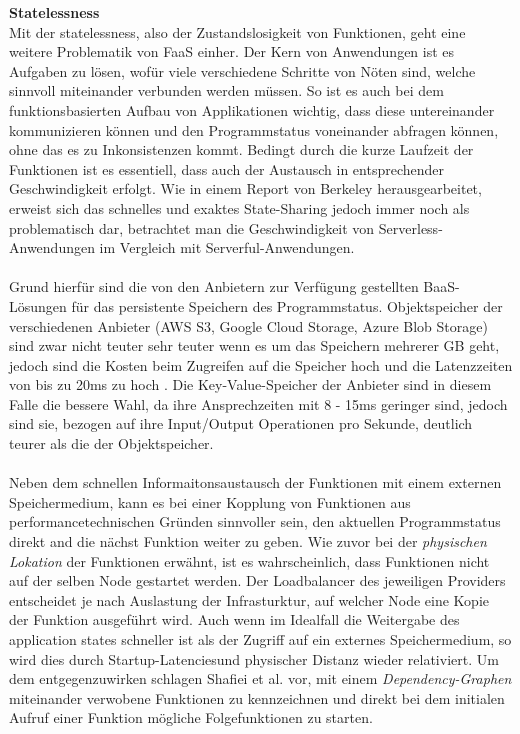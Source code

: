 \documentclass[11pt]{article}
\begin{document}
\glqq \textbf{Statelessness}\grqq{}\\
Mit der \glqq statelessness\grqq{}, also der Zustandslosigkeit von Funktionen, geht eine weitere Problematik von FaaS einher. Der Kern von Anwendungen ist es Aufgaben zu lösen, wofür viele verschiedene Schritte von Nöten sind, welche sinnvoll miteinander verbunden werden müssen. So ist es auch bei dem funktionsbasierten Aufbau von Applikationen wichtig, dass diese untereinander kommunizieren können und den Programmstatus voneinander abfragen können, ohne das es zu Inkonsistenzen kommt. Bedingt durch die kurze Laufzeit der Funktionen ist es essentiell, dass auch der Austausch in entsprechender Geschwindigkeit erfolgt. Wie in einem Report von Berkeley \cite{jonas2019cloud} herausgearbeitet, erweist sich das schnelles und exaktes \glqq State-Sharing\grqq{} jedoch immer noch als problematisch dar, betrachtet man die Geschwindigkeit von \glqq Serverless\grqq{}-Anwendungen im Vergleich mit \glqq Serverful\grqq{}-Anwendungen.\\\\ 
Grund hierfür sind die von den Anbietern zur Verfügung gestellten BaaS-Lösungen für das persistente Speichern des Programmstatus. Objektspeicher der verschiedenen Anbieter (AWS S3, Google Cloud Storage, Azure Blob Storage) sind zwar nicht teuter sehr teuter wenn es um das Speichern mehrerer GB geht, jedoch sind die Kosten beim Zugreifen auf die Speicher hoch und die Latenzzeiten von bis zu 20ms zu hoch \cite{jonas2019cloud}. Die Key-Value-Speicher der Anbieter sind in diesem Falle die bessere Wahl, da ihre Ansprechzeiten mit 8 - 15ms geringer sind, jedoch sind sie, bezogen auf ihre Input/Output Operationen pro Sekunde, deutlich teurer als die der Objektspeicher.\\\\ 
Neben dem schnellen Informaitonsaustausch der Funktionen mit einem externen Speichermedium, kann es bei einer Kopplung von Funktionen aus performancetechnischen Gründen sinnvoller sein, den aktuellen Programmstatus direkt and die nächst Funktion weiter zu geben. Wie zuvor bei der \textit{physischen Lokation} der Funktionen erwähnt, ist es wahrscheinlich, dass Funktionen nicht auf der selben Node gestartet werden. Der Loadbalancer des jeweiligen Providers entscheidet je nach Auslastung der Infrasturktur, auf welcher Node eine Kopie der Funktion ausgeführt wird. Auch wenn im Idealfall die Weitergabe des \glqq application states\grqq{} schneller ist als der Zugriff auf ein externes Speichermedium, so wird dies durch \glqq Startup-Latencies\grqq{}und physischer Distanz wieder relativiert. Um dem entgegenzuwirken schlagen Shaﬁei et al. \cite{shafiei2020serverless} vor, mit einem \textit{Dependency-Graphen} miteinander verwobene Funktionen zu kennzeichnen und direkt bei dem initialen Aufruf einer Funktion mögliche Folgefunktionen zu starten.\\\\ 
\end{document}
